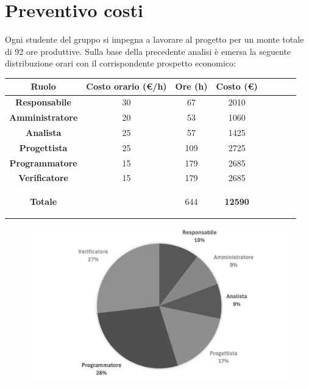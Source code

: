 \section{Preventivo costi}

Ogni studente del gruppo si impegna a lavorare al progetto per un monte totale di 92 ore
produttive. Sulla base della precedente analisi è emersa la seguente distribuzione orari con il corrispondente prospetto economico:

\begin{table}[H]
    \centering
    \renewcommand{\arraystretch}{1.5}
    \begin{tabular}{|>{\bfseries}c|c|c|c|c|c|c|>{\bfseries}c|}
        \hline
        \rowcolor{gray!70} 
        \color{white}\textbf{Ruolo} & \color{white}\textbf{Costo orario (\euro/h)} & \color{white}\textbf{Ore (h)} & \color{white}\textbf{Costo (\euro)} \\
        \hline
        \color{black}\textbf{Responsabile} & 30 & 67 & 2010  \\ 
        \hline
        \rowcolor{gray!10} %
        \color{black}\textbf{Amministratore} & 20 & 53 & 1060 \\ 
        \hline
        \color{black}\textbf{Analista} & 25 & 57 & 1425  \\ 
        \hline
        \rowcolor{gray!10} %
        \color{black}\textbf{Progettista} & 25 & 109 & 2725  \\ 
        \hline
         \color{black}\textbf{Programmatore} & 15 & 179 & 2685 \\ 
        \hline
        \rowcolor{gray!10} %
        \color{black}\textbf{Verificatore} & 15 & 179 & 2685 \\ 
        \hline

        \rowcolor{gray!70} 
        \color{white}\textbf{Totale} & \color{white} & \color{white}644 &  \cellcolor{black}\color{white}\textbf{12590}  \\ 
        \hline
    \end{tabular}


\end{table}

\begin{figure}[H]
    \centering
    \includegraphics[width=\textwidth]{./images/piechart.png}
\end{figure}